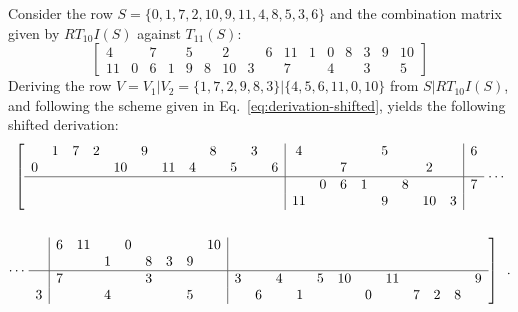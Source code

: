 \begin{example}
    \cite[216]{Starr1984}
    \label{ex:derivation-shifted}
    Consider the row $S = \{ 0, 1, 7, 2, 10, 9, 11, 4, 8, 5, 3, 6 \}$ and the combination matrix given by $RT_{10}I(S)$ against $T_{11}(S)$:
    \begin{equation}
        \left[
        \begin{array}{cccccccc|cccccccc}
            4 && 7 && 5 && 2 && 6 & 11 & 1 & 0 & 8 & 3 & 9 & 10 \\
            11 & 0 & 6 & 1 & 9 & 8 & 10 & 3 && 7 && 4 && 3 && 5
        \end{array}
        \right]
    \end{equation}
    Deriving the row $V = V_1 | V_2 = \{ 1, 7, 2, 9, 8, 3 \} | \{ 4, 5, 6, 11, 0, 10 \}$ from $S | RT_{10}I(S)$, and following the scheme given in Eq.~\ref{eq:derivation-shifted}, yields the following shifted derivation:
    \begin{multline}
        \left[
        \begin{array}{cccccccccccc|cccccccc|c}
            & 1 & 7 & 2 && 9 &&& 8 && 3 && 4 &&&& 5 &&&& 6 \\
            0 &&&& 10 && 11 & 4 && 5 && 6 & && 7 &&&& 2 && \\
            \hline
            &&&&&&&&&&&& & 0 & 6 & 1 && 8 &&& 7 \\
            &&&&&&&&&&&& 11 &&&& 9 && 10 & 3 &
        \end{array}
        \right. \cdots \\\\
        \cdots \left. \begin{array}{c|cccccccc|cccccccccccc}
            & 6 & 11 && 0 &&&& 10 &&&&&&&&&&& \\
            & && 1 && 8 & 3 & 9 & &&&&&&&&&&& \\
            \hline
            & 7 &&&& 3 &&& & 3 && 4 && 5 & 10 && 11 &&&& 9 \\
            3 &&& 4 &&&& 5 & && 6 && 1 &&& 0 && 7 & 2 & 8
        \end{array} \right] \enspace.
    \end{multline}
\end{example}

\vspace{12pt}

